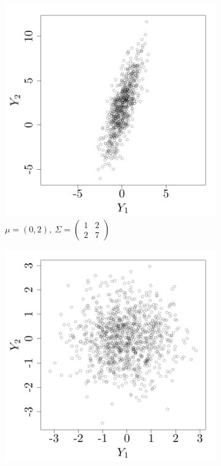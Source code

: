 \documentclass[twoside,openright]{report}
\begin{document}
\begin{figure}[ht!]
        \centering
        \begin{subfigure}[b]{0.34\textwidth}
                \includegraphics[width=\textwidth]{figures/ch1_gaussvec1}
                \caption{$\mu = (0,2),\ \Sigma= \left(\begin{smallmatrix} 1&2\\2&7 \end{smallmatrix} \right) $}
        \end{subfigure}%
        \hspace{1cm}       
        \begin{subfigure}[b]{0.34\textwidth}
                \includegraphics[width=\textwidth]{figures/ch1_gaussvec2}

\end{subfigure}
\end{figure}
\end{document}
